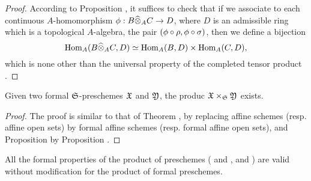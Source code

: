 \begin{proof}
\label{proof-1.10.7.2}
According to Proposition , it suffices to check that if we associate to each continuous $A$-homomorphism $\vphi:B\wh{\otimes}_A C\to D$, where $D$ is an admissible ring which is a topological $A$-algebra, the pair $(\phi\circ\rho,\phi\circ\sigma)$, then we define a bijection
\[
  {\mathop{\mathrm{Hom}}\nolimits}_A(B\widehat{\otimes}_A C,D)\simeq{\mathop{\mathrm{Hom}}\nolimits}_A(B,D)\times{\mathop{\mathrm{Hom}}\nolimits}_A(C,D),
\]
which is none other than the universal property of the completed tensor product .
\end{proof}

\begin{prop}[10.7.3]
\label{1.10.7.3}
Given two formal $\mathfrak{S}$-preschemes $\mathfrak{X}$ and $\mathfrak{Y}$, the produc $\mathfrak{X}\times_\mathfrak{S}\mathfrak{Y}$ exists.
\end{prop}

\begin{proof}
\label{proof-1.10.7.3}
The proof is similar to that of Theorem , by replacing affine schemes (resp. affine open sets) by formal affine schemes (resp. formal affine open sets), and Proposition  by Proposition .
\end{proof}

All the formal properties of the product of preschemes ( and ,  and ) are valid without modification for the product of formal preschemes.

